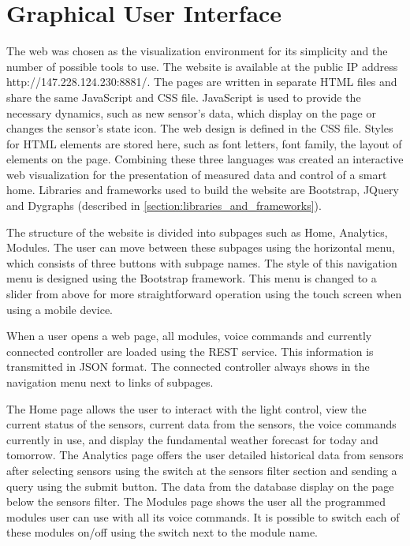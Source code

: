 \chapter{Graphical User Interface} \label{chap:GUI}

The web was chosen as the visualization environment for its simplicity and the number of possible tools to use. The website is available at the public IP address http://147.228.124.230:8881/. The pages are written in separate HTML files and share the same JavaScript and CSS file. JavaScript is used to provide the necessary dynamics, such as new sensor's data, which display on the page or changes the sensor's state icon. The web design is defined in the CSS file. Styles for HTML elements are stored here, such as font letters, font family, the layout of elements on the page. Combining these three languages was created an interactive web visualization for the presentation of measured data and control of a smart home. Libraries and frameworks used to build the website are Bootstrap, JQuery and Dygraphs (described in \cref{section:libraries_and_frameworks}).

The structure of the website is divided into subpages such as Home, Analytics, Modules. The user can move between these subpages using the horizontal menu, which consists of three buttons with subpage names. The style of this navigation menu is designed using the Bootstrap framework. This menu is changed to a slider from above for more straightforward operation using the touch screen when using a mobile device.

When a user opens a web page, all modules, voice commands and currently connected controller are loaded using the REST service. This information is transmitted in JSON format. The connected controller always shows in the navigation menu next to links of subpages.

The Home page allows the user to interact with the light control, view the current status of the sensors, current data from the sensors, the voice commands currently in use, and display the fundamental weather forecast for today and tomorrow. The Analytics page offers the user detailed historical data from sensors after selecting sensors using the switch at the sensors filter section and sending a query using the submit button. The data from the database display on the page below the sensors filter. The Modules page shows the user all the programmed modules user can use with all its voice commands. It is possible to switch each of these modules on/off using the switch next to the module name.

